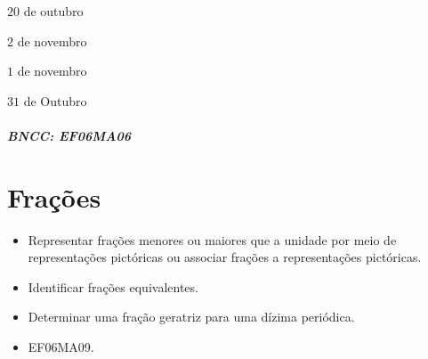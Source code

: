 {\begin{escolha}
\item $20$ de outubro
\item $2$ de novembro
\item $1$ de novembro
\item $31$ de Outubro
\end{escolha}

\paragraph{BNCC: EF06MA06 }


\chapter{Frações}

\begin{itemize}
\item Representar frações menores ou maiores que a
unidade por meio de representações pictóricas ou associar frações a
representações pictóricas.
\item
  Identificar frações equivalentes.
\item
  Determinar uma fração geratriz para uma dízima periódica.
\end{itemize}

\begin{itemize}
\item EF06MA09.
\end{itemize}

}
